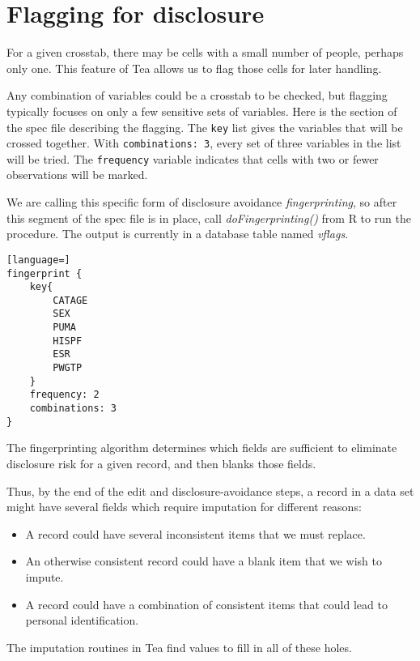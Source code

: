 \documentclass{article}
\begin{document}
\section{Flagging for disclosure} For a given crosstab, there may be cells with a
small number of people, perhaps only one. This feature of Tea allows us to flag those
cells for later handling.

Any combination of variables could be a crosstab to be checked, but flagging
typically focuses on only a few sensitive sets of variables. Here is the section
of the spec file describing the flagging. The {\tt key} list gives the variables
that will be crossed together. With {\tt combinations: 3}, every set of three
variables in the list will be tried. The {\tt frequency} variable indicates that
cells with two or fewer observations will be marked.

We are calling this specific form of disclosure avoidance {\em fingerprinting}, so after
this segment of the spec file is in place, call {\em doFingerprinting()} from R to run the
procedure. The output is currently in a database table named {\em vflags}.

\begin{lstlisting}[language=]
fingerprint {
    key{
        CATAGE
        SEX
        PUMA
        HISPF
        ESR
        PWGTP
    }
    frequency: 2
    combinations: 3
}
\end{lstlisting}

The fingerprinting algorithm determines which fields are sufficient to eliminate
disclosure risk for a given record, and then blanks those fields.


Thus, by the end of the edit and disclosure-avoidance steps,
a record in a data set might have several fields which require imputation for different reasons:
\begin{itemize}
\item A record could have several inconsistent items that we must replace.
\item An otherwise consistent record could have a blank item that we wish to impute.
\item A record could have a combination of consistent items that could lead to personal identification.
\end{itemize}

The imputation routines in Tea find values to fill in all of these holes.

\end{document}
